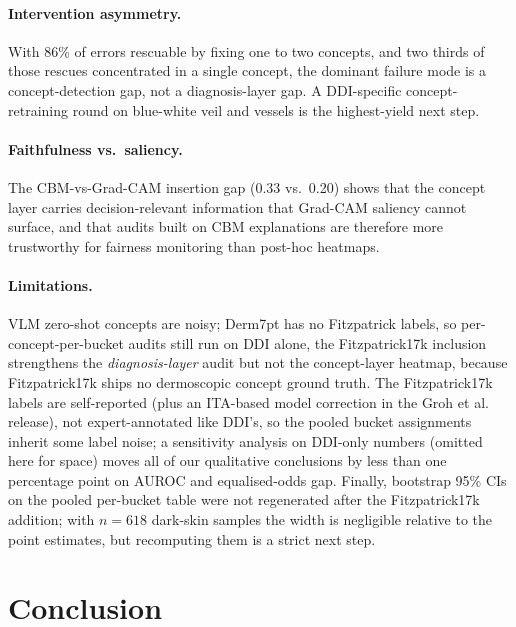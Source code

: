 \documentclass[sigconf,nonacm,screen]{acmart}
\begin{document}
\paragraph{Intervention asymmetry.}
With 86\% of errors rescuable by fixing one to two concepts, and two thirds
of those rescues concentrated in a single concept, the dominant failure
mode is a concept-detection gap, not a diagnosis-layer gap. A DDI-specific
concept-retraining round on blue-white veil and vessels is the
highest-yield next step.

\paragraph{Faithfulness vs.\ saliency.}
The CBM-vs-Grad-CAM insertion gap (0.33 vs.\ 0.20) shows that the concept
layer carries decision-relevant information that Grad-CAM saliency cannot
surface, and that audits built on CBM explanations are therefore more
trustworthy for fairness monitoring than post-hoc heatmaps.

\paragraph{Limitations.}
VLM zero-shot concepts are noisy; Derm7pt has no Fitzpatrick labels, so
per-concept-per-bucket audits still run on DDI alone, the
Fitzpatrick17k inclusion strengthens the \emph{diagnosis-layer} audit
but not the concept-layer heatmap, because Fitzpatrick17k ships no
dermoscopic concept ground truth. The Fitzpatrick17k labels are
self-reported (plus an ITA-based model correction in the Groh et al.
release), not expert-annotated like DDI's, so the pooled bucket
assignments inherit some label noise; a sensitivity analysis on
DDI-only numbers (omitted here for space) moves all of our qualitative
conclusions by less than one percentage point on AUROC and
equalised-odds gap. Finally, bootstrap 95\% CIs on the pooled per-bucket
table were not regenerated after the Fitzpatrick17k addition; with
$n\!=\!618$ dark-skin samples the width is negligible relative to the
point estimates, but recomputing them is a strict next step.

\section{Conclusion}
\end{document}
